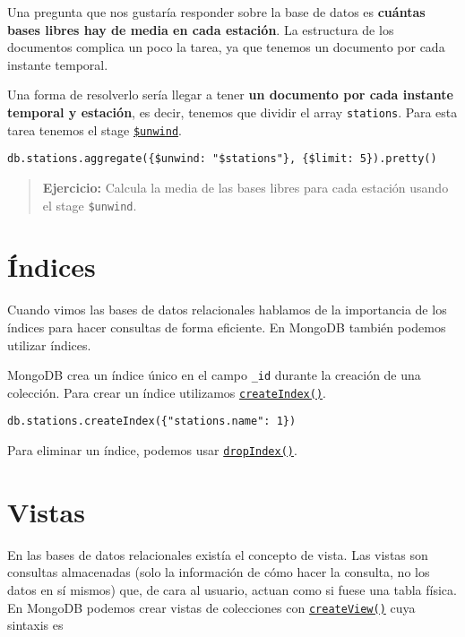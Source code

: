 \documentclass[]{article}
\begin{document}
Una pregunta que nos gustaría responder sobre la base de datos es
\textbf{cuántas bases libres hay de media en cada estación}. La
estructura de los documentos complica un poco la tarea, ya que tenemos
un documento por cada instante temporal.

Una forma de resolverlo sería llegar a tener \textbf{un documento por
cada instante temporal y estación}, es decir, tenemos que dividir el
array \texttt{stations}. Para esta tarea tenemos el stage
\href{https://docs.mongodb.com/manual/reference/operator/aggregation/unwind/}{\texttt{\$unwind}}.

\begin{verbatim}
db.stations.aggregate({$unwind: "$stations"}, {$limit: 5}).pretty()
\end{verbatim}

\begin{quote}
\textbf{Ejercicio:} Calcula la media de las bases libres para cada
estación usando el stage \texttt{\$unwind}.
\end{quote}

\hypertarget{indices}{%
\section{Índices}\label{indices}}

Cuando vimos las bases de datos relacionales hablamos de la importancia
de los índices para hacer consultas de forma eficiente. En MongoDB
también podemos utilizar índices.

MongoDB crea un índice único en el campo \texttt{\_id} durante la
creación de una colección. Para crear un índice utilizamos
\href{https://docs.mongodb.com/manual/reference/method/db.collection.createIndex/}{\texttt{createIndex()}}.

\begin{verbatim}
db.stations.createIndex({"stations.name": 1})
\end{verbatim}

Para eliminar un índice, podemos usar
\href{https://docs.mongodb.com/manual/reference/method/db.collection.dropIndex/}{\texttt{dropIndex()}}.

\hypertarget{vistas}{%
\section{Vistas}\label{vistas}}

En las bases de datos relacionales existía el concepto de vista. Las
vistas son consultas almacenadas (solo la información de cómo hacer la
consulta, no los datos en sí mismos) que, de cara al usuario, actuan
como si fuese una tabla física. En MongoDB podemos crear vistas de
colecciones con
\href{https://docs.mongodb.com/manual/reference/method/db.createView/}{\texttt{createView()}}
cuya sintaxis es
\end{document}
